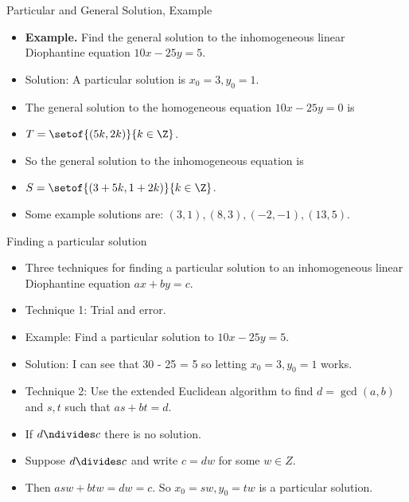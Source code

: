 \documentclass[handout]{beamer}
\begin{document}
\begin{frame}{Particular and General Solution, Example}

\begin{itemize}
  \item \textbf{Example.} Find the general solution to the inhomogeneous linear Diophantine equation
  $10x - 25y = 5$.
  \item Solution: A particular solution is $x_0=3, y_0 = 1$.
  \item The general solution to the homogeneous equation $10x - 25y = 0$ is
  \item $T=\setof{(5k, 2k)}{k\in\Z}$.
  \item So the general solution to the inhomogeneous equation is
  \item $S = \setof{(3 + 5k, 1 + 2k)}{k\in\Z}$.
  \item Some example solutions are: $(3,1), (8,3), (-2, -1), (13, 5)$.
\end{itemize}
\end{frame}


\begin{frame}{Finding a particular solution}

\begin{itemize}
  \item Three techniques for finding a particular solution to an inhomogeneous linear Diophantine equation
  $ax+by=c$.
  \item Technique 1: Trial and error.
  \item Example: Find a particular solution to $10x - 25y = 5$.
  \item Solution: I can see that 30 - 25 = 5 so letting $x_0=3, y_0 = 1$ works.
  \item Technique 2: Use the extended Euclidean algorithm to find $d=\gcd(a,b)$
  and $s,t$ such that $as + bt = d$.
  \item If $d\ndivides c$ there is no solution.
  \item Suppose $d\divides c$ and write $c=d w$ for some $w\in Z$.
  \item Then $asw + btw = dw = c$. So $x_0 = sw, y_0 = tw$ is a particular solution.
\end{itemize}

\end{frame}

\end{document}
